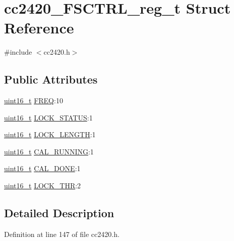 \hypertarget{structcc2420___f_s_c_t_r_l__reg__t}{}\section{cc2420\+\_\+\+F\+S\+C\+T\+R\+L\+\_\+reg\+\_\+t Struct Reference}
\label{structcc2420___f_s_c_t_r_l__reg__t}


{\ttfamily \#include $<$cc2420.\+h$>$}

\subsection*{Public Attributes}
\begin{DoxyCompactItemize}
\item 
\hyperlink{_p_e___types_8h_a1f1825b69244eb3ad2c7165ddc99c956}{uint16\+\_\+t} \hyperlink{structcc2420___f_s_c_t_r_l__reg__t_a80e36f823e478ac27d782f6dea37d740}{F\+R\+EQ}\+:10
\item 
\hyperlink{_p_e___types_8h_a1f1825b69244eb3ad2c7165ddc99c956}{uint16\+\_\+t} \hyperlink{structcc2420___f_s_c_t_r_l__reg__t_a50864762b6f8331d2fe5fd824c1858ed}{L\+O\+C\+K\+\_\+\+S\+T\+A\+T\+US}\+:1
\item 
\hyperlink{_p_e___types_8h_a1f1825b69244eb3ad2c7165ddc99c956}{uint16\+\_\+t} \hyperlink{structcc2420___f_s_c_t_r_l__reg__t_a6d93c3225803ecc189506d6026293148}{L\+O\+C\+K\+\_\+\+L\+E\+N\+G\+TH}\+:1
\item 
\hyperlink{_p_e___types_8h_a1f1825b69244eb3ad2c7165ddc99c956}{uint16\+\_\+t} \hyperlink{structcc2420___f_s_c_t_r_l__reg__t_ab8b645ad96850e5516249689031ce155}{C\+A\+L\+\_\+\+R\+U\+N\+N\+I\+NG}\+:1
\item 
\hyperlink{_p_e___types_8h_a1f1825b69244eb3ad2c7165ddc99c956}{uint16\+\_\+t} \hyperlink{structcc2420___f_s_c_t_r_l__reg__t_a2baefab4a24bd8e973cabc43be1c0dc2}{C\+A\+L\+\_\+\+D\+O\+NE}\+:1
\item 
\hyperlink{_p_e___types_8h_a1f1825b69244eb3ad2c7165ddc99c956}{uint16\+\_\+t} \hyperlink{structcc2420___f_s_c_t_r_l__reg__t_aba0a5677458734833bf2cd9de62217c4}{L\+O\+C\+K\+\_\+\+T\+HR}\+:2
\end{DoxyCompactItemize}


\subsection{Detailed Description}


Definition at line 147 of file cc2420.\+h.




